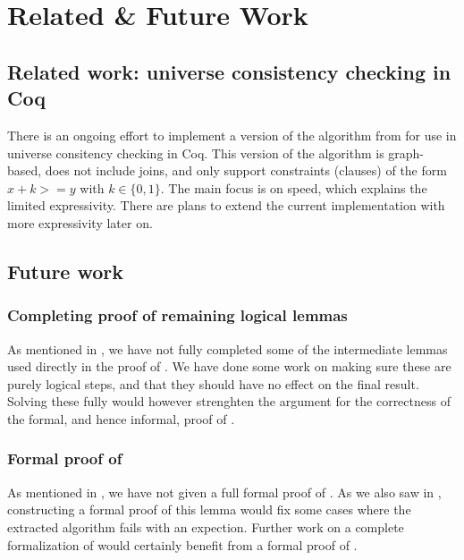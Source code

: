 \chapter{Related \& Future Work}

\section{Related work: universe consistency checking in Coq}

There is an ongoing effort \cite{coqgithub} to implement a version of the algorithm from \cite{mbezem}
for use in universe consitency checking in Coq.
This version of the algorithm is graph-based, does not include joins,
and only support constraints (clauses) of the form $x + k >= y$ with $k \in \{0, 1\}$.
The main focus is on speed, which explains the limited expressivity.
There are plans to extend the current implementation with more expressivity later on.

\section{Future work}

\subsection{Completing proof of remaining logical lemmas}

As mentioned in , we have not fully completed
some of the intermediate lemmas used directly in the proof of .
We have done some work on making sure these are purely logical steps,
and that they should have no effect on the final result.
Solving these fully would however strenghten the argument for the correctness of the formal,
and hence informal, proof of .

\subsection{Formal proof of }

As mentioned in , we have not given a full formal proof
of . As we also saw in , constructing a formal proof of this lemma
would fix some cases where the extracted algorithm fails with an expection.
Further work on a complete formalization of  would certainly benefit from a formal proof of .


